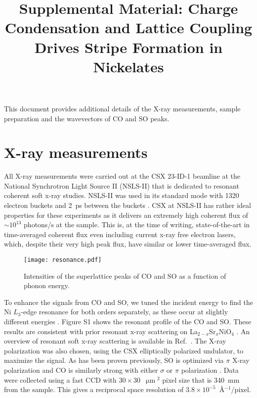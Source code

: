 \documentclass[aps,prl,showpacs,floatfix,onecolumn,superscriptaddress,longbibliography,notitlepage]{revtex4-1}
\def\um{\ensuremath{\upmu\text{m}}}
\begin{document}
\title{Supplemental Material: Charge Condensation and Lattice Coupling Drives Stripe Formation in Nickelates}

\renewcommand{\thepage}{S\arabic{page}} 
\renewcommand{\thesection}{S\arabic{section}}  
\renewcommand{\thetable}{S\arabic{table}}  
\renewcommand{\thefigure}{S\arabic{figure}}

\maketitle

This document provides additional details of the X-ray measurements, sample preparation and the wavevectors of \gls{CO} and \gls{SO} peaks.

\section{X-ray measurements}

All X-ray measurements were carried out at the \gls{CSX} 23-ID-1 beamline at the National Synchrotron  Light Source II (NSLS-II) that is dedicated to resonant coherent soft x-ray studies. NSLS-II was used in its standard mode with 1320 electron buckets and 2~ps between the buckets \cite{nsls2url}. \gls{CSX} at NSLS-II has rather ideal properties for these experiments as it delivers an extremely high coherent flux of $\sim10^{13}$ photons/s at the sample. This is, at the time of writing, state-of-the-art in time-averaged coherent flux even including current x-ray free electron lasers, which, despite their very high peak flux, have similar or lower time-averaged flux.

\begin{figure}
\texttt{[image: resonance.pdf]}
\caption{Intensities of the superlattice peaks of \gls{CO} and \gls{SO} as a function of phonon energy.}
\end{figure}

To enhance the signals from \gls{CO} and \gls{SO}, we tuned the incident energy to find the Ni $L_3$-edge resonance for both orders separately, as these occur at slightly different energies \cite{Schussler2005LSNO}. Figure S1 shows the resonant profile of the \gls{CO} and \gls{SO}. These results are consistent with prior resonant x-ray scattering on La$_{2-x}$Sr$_x$NiO$_4$ \cite{Schussler2005LSNO}. An overview of resonant soft x-ray scattering is available in Ref.~\cite{Fink2013resonant}.  The X-ray polarization was also chosen, using the \gls{CSX} elliptically polarized undulator, to maximize the signal. As has been proven previously, \gls{SO} is optimized via $\pi$ X-ray polarization and \gls{CO} is similarly strong with either $\sigma$ or $\pi$ polarization \cite{Schussler2005LSNO}. Data were collected using a fast CCD with $30 \times 30$~\um$^2$ pixel size that is 340~mm from the sample. This gives a reciprocal space resolution of $3.8\times10^{-5}$~\AA$^{-1}$/pixel.
\end{document}

